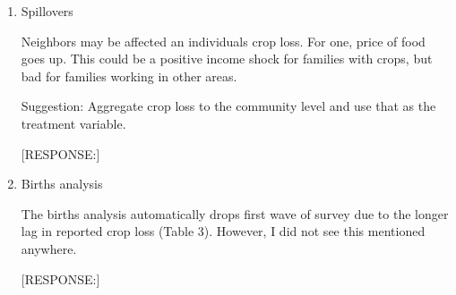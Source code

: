 \documentclass[letterpaper,12pt]{article}
\begin{document}
\begin{enumerate}


\item Spillovers

Neighbors may be affected an individuals crop loss. For one, price of
food goes up. This could be a positive income shock for families with
crops, but bad for families working in other areas.

Suggestion: Aggregate crop loss to the community level and use that as
the treatment variable.


[RESPONSE:]


\item Births analysis

The births analysis automatically drops first wave of survey due to the
longer lag in reported crop loss (Table 3). However, I did not see this
mentioned anywhere.

[RESPONSE:]


\end{enumerate}


\newpage


\end{document}
